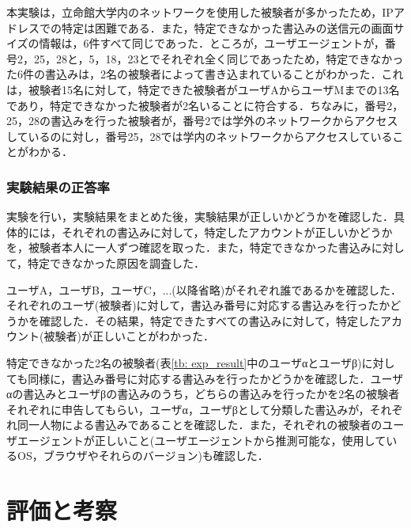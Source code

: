 \documentclass[10pt, a4paper]{jreport}
\begin{document}
本実験は，立命館大学内のネットワークを使用した被験者が多かったため，IPアドレスでの特定は困難である．また，特定できなかった書込みの送信元の画面サイズの情報は，6件すべて同じであった．ところが，ユーザエージェントが，番号2，25，28と，5，18，23とでそれぞれ全く同じであったため，特定できなかった6件の書込みは，2名の被験者によって書き込まれていることがわかった．これは，被験者15名に対して，特定できた被験者がユーザAからユーザMまでの13名であり，特定できなかった被験者が2名いることに符合する．ちなみに，番号2，25，28の書込みを行った被験者が，番号2では学外のネットワークからアクセスしているのに対し，番号25，28では学内のネットワークからアクセスしていることがわかる．

\subsection{実験結果の正答率}
実験を行い，実験結果をまとめた後，実験結果が正しいかどうかを確認した．具体的には，それぞれの書込みに対して，特定したアカウントが正しいかどうかを，被験者本人に一人ずつ確認を取った．また，特定できなかった書込みに対して，特定できなかった原因を調査した．

ユーザA，ユーザB，ユーザC，...(以降省略)がそれぞれ誰であるかを確認した．それぞれのユーザ(被験者)に対して，書込み番号に対応する書込みを行ったかどうかを確認した．その結果，特定できたすべての書込みに対して，特定したアカウント(被験者)が正しいことがわかった．

特定できなかった2名の被験者(表\ref{tb: exp_result}中のユーザαとユーザβ)に対しても同様に，書込み番号に対応する書込みを行ったかどうかを確認した．ユーザαの書込みとユーザβの書込みのうち，どちらの書込みを行ったかを2名の被験者それぞれに申告してもらい，ユーザα，ユーザβとして分類した書込みが，それぞれ同一人物による書込みであることを確認した．また，それぞれの被験者のユーザエージェントが正しいこと(ユーザエージェントから推測可能な，使用しているOS，ブラウザやそれらのバージョン)も確認した．












\chapter{評価と考察}
\end{document}

